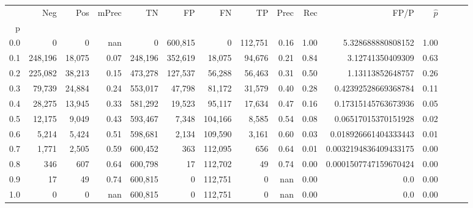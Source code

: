 \begin{tabular}{rrrrrrrrrrrrrrr}
\toprule
{} &      Neg &     Pos & mPrec &       TN &       FP &       FN &       TP &  Prec &   Rec &                   FP/P & $\hat{p}$ \\
p   &          &         &       &          &          &          &          &       &       &                        &           \\
\midrule
0.0 &        0 &       0 &   nan &        0 &  600,815 &        0 &  112,751 &  0.16 &  1.00 &      5.328688880808152 &      1.00 \\
0.1 &  248,196 &  18,075 &  0.07 &  248,196 &  352,619 &   18,075 &   94,676 &  0.21 &  0.84 &       3.12741350409309 &      0.63 \\
0.2 &  225,082 &  38,213 &  0.15 &  473,278 &  127,537 &   56,288 &   56,463 &  0.31 &  0.50 &       1.13113852648757 &      0.26 \\
0.3 &   79,739 &  24,884 &  0.24 &  553,017 &   47,798 &   81,172 &   31,579 &  0.40 &  0.28 &    0.42392528669368784 &      0.11 \\
0.4 &   28,275 &  13,945 &  0.33 &  581,292 &   19,523 &   95,117 &   17,634 &  0.47 &  0.16 &    0.17315145763673936 &      0.05 \\
0.5 &   12,175 &   9,049 &  0.43 &  593,467 &    7,348 &  104,166 &    8,585 &  0.54 &  0.08 &    0.06517015370151928 &      0.02 \\
0.6 &    5,214 &   5,424 &  0.51 &  598,681 &    2,134 &  109,590 &    3,161 &  0.60 &  0.03 &   0.018926661404333443 &      0.01 \\
0.7 &    1,771 &   2,505 &  0.59 &  600,452 &      363 &  112,095 &      656 &  0.64 &  0.01 &  0.0032194836409433175 &      0.00 \\
0.8 &      346 &     607 &  0.64 &  600,798 &       17 &  112,702 &       49 &  0.74 &  0.00 &  0.0001507747159670424 &      0.00 \\
0.9 &       17 &      49 &  0.74 &  600,815 &        0 &  112,751 &        0 &   nan &  0.00 &                    0.0 &      0.00 \\
1.0 &        0 &       0 &   nan &  600,815 &        0 &  112,751 &        0 &   nan &  0.00 &                    0.0 &      0.00 \\
\bottomrule
\end{tabular}
